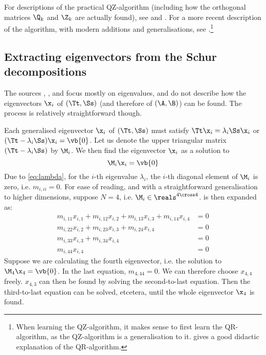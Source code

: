 For descriptions of the practical QZ-algorithm (including how the orthogonal
matrices $\Q_k$ and $\Z_k$ are actually found), see \cite{Moler1973} and
\cite[Section 7.7]{Golub2013}. For a more recent description of the
algorithm, with modern additions and generalisations, see \cite[Chapter
6]{Watkins2007}.\footnote{When learning the QZ-algorithm, it makes sense to
first learn the QR-algorithm, as the QZ-algorithm is a generalisation to it.
\cite{Trefethen1997} gives a good didactic explanation of the QR-algorithm.}



\subsection{Extracting eigenvectors from the Schur decompositions}

The sources \cite{Moler1973}, \cite{Golub2013}, and \cite{Watkins2007} focus
mostly on eigenvalues, and do not describe how the eigenvectors $\x_i$ of
$(\Tt,\Ss)$ (and therefore of $(\A,\B)$) can be found.\footnotemark{} The
process is relatively straightforward though.


Each generalised eigenvector $\x_i$ of $(\Tt,\Ss)$ must satisfy $\Tt \x_i =
\lambda_i \Ss \x_i$ or $(\Tt - \lambda_i \Ss) \x_i = \vb{0}$. Let us denote
the upper triangular matrix $(\Tt - \lambda_i \Ss)$ by $\M_i$. We then find
the eigenvector $\x_i$ as a solution to
\begin{equation}
\label{eq:M}
\M_i \x_i = \vb{0}
\end{equation}
%
Due to \cref{eq:lambda}, for the $i$-th eigenvalue $\lambda_i$, the $i$-th
diagonal element of $\M_i$ is zero, i.e. $m_{i,ii} = 0$.
%
For ease of reading, and with a straightforward generalisation to higher
dimensions, suppose $N = 4$, i.e. $\M_i \in \reals^{4 \cross 4}$. 
is then expanded as:
\begin{align*}
m_{i,11} x_{i,1} 
+ m_{i,12} x_{i,2} + m_{i,13} x_{i,3} + m_{i,14} x_{i,4} &= 0 \\
  m_{i,22} x_{i,2} + m_{i,23} x_{i,3} + m_{i,24} x_{i,4} &= 0 \\
                     m_{i,33} x_{i,3} + m_{i,34} x_{i,4} &= 0 \\
                                        m_{i,44} x_{i,4} &= 0
\end{align*}
%
Suppose we are calculating the fourth eigenvector, i.e. the solution to $\M_4
\x_4 = \vb{0}$. In the last equation, $m_{4,44} = 0$. We can therefore choose
$x_{4,4}$ freely. $x_{4,3}$ can then be found by solving the second-to-last
equation. Then the third-to-last equation can be solved, etcetera, until the
whole eigenvector $\x_4$ is found.

